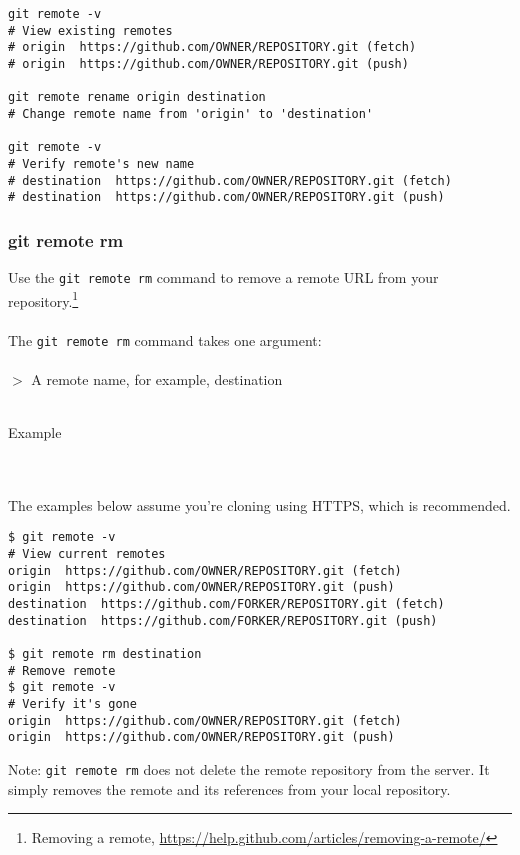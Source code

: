 \documentclass[12pt,letterpaper,dvips]{article}
\newcommand{\cmd}[1]{\texttt{#1}}
\begin{document}
\begin{Verbatim}
git remote -v
# View existing remotes
# origin  https://github.com/OWNER/REPOSITORY.git (fetch)
# origin  https://github.com/OWNER/REPOSITORY.git (push)

git remote rename origin destination
# Change remote name from 'origin' to 'destination'

git remote -v
# Verify remote's new name
# destination  https://github.com/OWNER/REPOSITORY.git (fetch)
# destination  https://github.com/OWNER/REPOSITORY.git (push)
\end{Verbatim}


\subsubsection{git remote rm}
Use the \cmd{git remote rm} command to remove a remote URL
from your repository.\footnote{Removing a remote,
\href{https://help.github.com/articles/removing-a-remote/}{https://help.github.com/articles/removing-a-remote/}}
\\
\\
The \cmd{git remote rm} command takes one argument:
\\
\\
$>$ A remote name, for example, destination
\\
\\
\noindent \begin{bf}Example\end{bf}
\\
\\
The examples below assume you're cloning using HTTPS, which is recommended.

\begin{Verbatim}
$ git remote -v
# View current remotes
origin  https://github.com/OWNER/REPOSITORY.git (fetch)
origin  https://github.com/OWNER/REPOSITORY.git (push)
destination  https://github.com/FORKER/REPOSITORY.git (fetch)
destination  https://github.com/FORKER/REPOSITORY.git (push)

$ git remote rm destination
# Remove remote
$ git remote -v
# Verify it's gone
origin  https://github.com/OWNER/REPOSITORY.git (fetch)
origin  https://github.com/OWNER/REPOSITORY.git (push)
\end{Verbatim}

\noindent Note: \cmd{git remote rm} does not delete the remote
repository from the server.  It simply removes the remote and
its references from your local repository.
\end{document}
